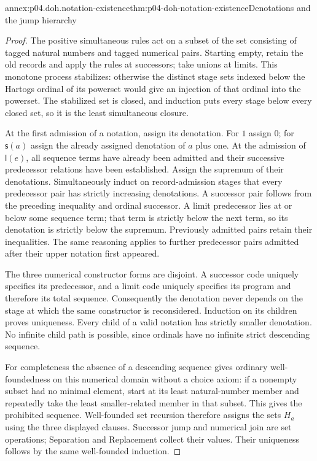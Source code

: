 \begin{annexitem}{annex:p04.doh.notation-existence}{thm:p04-doh-notation-existence}{Denotations and the jump hierarchy}
\begin{proof}
The positive simultaneous rules act on a subset of the set consisting
of tagged natural numbers and tagged numerical pairs. Starting empty,
retain the old records and apply the rules at successors; take unions
at limits. This monotone process stabilizes: otherwise the distinct
stage sets indexed below the Hartogs ordinal of its powerset would
give an injection of that ordinal into the powerset. The stabilized
set is closed, and induction puts every stage below every closed set,
so it is the least simultaneous closure.

At the first admission of a notation, assign its denotation. For \(1\)
assign \(0\); for \(\mathsf s(a)\) assign the already assigned
denotation of \(a\) plus one. At the admission of \(\mathsf l(e)\),
all sequence terms have already been admitted and their successive
predecessor relations have been established. Assign the supremum of
their denotations. Simultaneously induct on record-admission stages
that every predecessor pair has strictly increasing denotations.
A successor pair follows from the preceding inequality and ordinal
successor. A limit predecessor lies at or below some sequence term;
that term is strictly below the next term, so its denotation is
strictly below the supremum. Previously admitted pairs retain their
inequalities. The same reasoning applies to further predecessor
pairs admitted after their upper notation first appeared.

The three numerical constructor forms are disjoint. A successor code
uniquely specifies its predecessor, and a limit code uniquely specifies
its program and therefore its total sequence. Consequently the
denotation never depends on the stage at which the same constructor
is reconsidered. Induction on its children proves uniqueness.
Every child of a valid notation has strictly smaller denotation.
No infinite child path is possible, since ordinals have no infinite
strict descending sequence.

For completeness the absence of a descending sequence gives ordinary
well-foundedness on this numerical domain without a choice axiom:
if a nonempty subset had no minimal element, start at its least
natural-number member and repeatedly take the least smaller-related
member in that subset. This gives the prohibited sequence.
Well-founded set recursion therefore assigns the sets \(H_a\) using
the three displayed clauses. Successor jump and numerical join are
set operations; Separation and Replacement collect their values.
Their uniqueness follows by the same well-founded induction.
\end{proof}
\end{annexitem}

